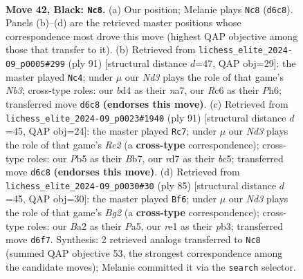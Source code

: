 \documentclass[11pt]{article}
\begin{document}
\clearpage

\begin{figure}[p]\centering
\begin{subfigure}{0.46\textwidth}\centering
\resizebox{\linewidth}{!}{%
\newchessgame
\chessboard[
  setfen={5k2/3R4/2rn4/1p4p1/r2B4/4P1P1/b4PKP/4R3 b - - 3 42},
  showmover=false,
  pgfstyle=straightmove, color=movearrow, markmove={d6-c8}
]}
\caption{}
\end{subfigure}\hfill
\begin{subfigure}{0.46\textwidth}\centering
\resizebox{\linewidth}{!}{%
\newchessgame
\chessboard[
  setfen={7k/N1r5/Rn5p/1P4p1/8/6P1/1R3PKP/4r3 b - - 2 46},
  showmover=false,
  pgfstyle=straightmove, color=movearrow, markmove={b6-c4}
]}
\caption{}
\end{subfigure}
\\[4pt]
\begin{subfigure}{0.46\textwidth}\centering
\resizebox{\linewidth}{!}{%
\newchessgame
\chessboard[
  setfen={8/1b2rk2/6p1/2Bn3p/1P5P/5PK1/3R2P1/8 b - - 2 46},
  showmover=false,
  pgfstyle=straightmove, color=movearrow, markmove={e7-c7}
]}
\caption{}
\end{subfigure}\hfill
\begin{subfigure}{0.46\textwidth}\centering
\resizebox{\linewidth}{!}{%
\newchessgame
\chessboard[
  setfen={8/5Rb1/4p3/p2r2k1/7p/1P1BP3/P3KP2/8 b - - 0 43},
  showmover=false,
  pgfstyle=straightmove, color=movearrow, markmove={g7-f6}
]}
\caption{}
\end{subfigure}
\caption{\textbf{Move 42, Black: \texttt{Nc8}.} (a) Our position; Melanie plays \texttt{Nc8} (\texttt{d6c8}). Panels (b)--(d) are the retrieved master positions whose correspondence most drove this move (highest QAP objective among those that transfer to it). (b) Retrieved from \texttt{lichess\_elite\_2024-09\_p0005\#299} (ply 91) [structural distance $d$=47, QAP obj=29]: the master played \texttt{Nc4}; under $\mu$ our \emph{Nd3} plays the role of that game's \emph{Nb3}; cross-type roles: our \emph{b}d4 as their \emph{n}a7, our \emph{R}c6 as their \emph{P}h6; transferred move \texttt{d6c8} \textbf{(endorses this move)}. (c) Retrieved from \texttt{lichess\_elite\_2024-09\_p0023\#1940} (ply 91) [structural distance $d$=45, QAP obj=24]: the master played \texttt{Rc7}; under $\mu$ our \emph{Nd3} plays the role of that game's \emph{Re2} (a \textbf{cross-type} correspondence); cross-type roles: our \emph{P}b5 as their \emph{B}b7, our \emph{r}d7 as their \emph{b}c5; transferred move \texttt{d6c8} \textbf{(endorses this move)}. (d) Retrieved from \texttt{lichess\_elite\_2024-09\_p0030\#30} (ply 85) [structural distance $d$=45, QAP obj=30]: the master played \texttt{Bf6}; under $\mu$ our \emph{Nd3} plays the role of that game's \emph{Bg2} (a \textbf{cross-type} correspondence); cross-type roles: our \emph{B}a2 as their \emph{P}a5, our \emph{r}e1 as their \emph{p}b3; transferred move \texttt{d6f7}. Synthesis: 2 retrieved analogs transferred to \texttt{Nc8} (summed QAP objective 53, the strongest correspondence among the candidate moves); Melanie committed it via the \texttt{search} selector.}
\label{fig:thought-m83}
\end{figure}
\end{document}
